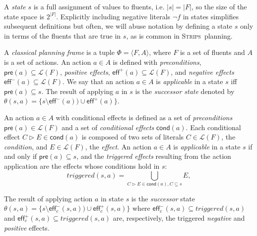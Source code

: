 \documentclass[3p,times]{elsarticle}
\newcommand{\pre}{\mathsf{pre}}  %
\newcommand{\eff}{\mathsf{eff}}  %
\newcommand{\cond}{\mathsf{cond}}   %
\newcommand{\strips}{\textsc{Strips}}     %
\newcommand{\tup}[1]{{\langle #1 \rangle}}
\begin{document}
A {\em state} $s$ is a full assignment of values to fluents, i.e. $|s|=|F|$, so the size of the state space is $2^{|F|}$. Explicitly including negative literals $\neg f$ in states simplifies subsequent definitions but often, we will abuse notation by defining a state $s$ only in terms of the fluents that are true in $s$, as is common in \strips\ planning.

A {\em classical planning frame} is a tuple $\Phi=\tup{F,A}$, where $F$ is a set of fluents and $A$ is a set of actions. An action $a\in A$ is defined with {\em preconditions}, $\pre(a)\subseteq\mathcal{L}(F)$, {\em positive effects}, $\eff^+(a)\subseteq\mathcal{L}(F)$, and {\em negative effects} $\eff^-(a)\subseteq\mathcal{L}(F)$. We say that an action $a\in A$ is {\em applicable} in a state $s$ iff $\pre(a)\subseteq s$. The result of applying $a$ in $s$ is the {\em successor state} denoted by $\theta(s,a)=\{s\setminus\eff^-(a))\cup\eff^+(a)\}$.



An action $a\in A$ with conditional effects is defined as a set of {\em preconditions} $\pre(a)\in\mathcal{L}(F)$ and a set of {\em conditional effects} $\cond(a)$. Each conditional effect $C\rhd E\in\cond(a)$ is composed of two sets of literals $C\in\mathcal{L}(F)$, the {\em condition}, and $E\in\mathcal{L}(F)$, the {\em effect}. An action $a\in A$ is {\em applicable} in a state $s$ if and only if $\pre(a)\subseteq s$, and the {\em triggered effects} resulting from the action application are the effects whose conditions hold in $s$:
\[
triggered(s,a)=\bigcup_{C\rhd E\in\cond(a),C\subseteq s} E,
\]

The result of applying action $a$ in state $s$ is the {\em successor} state $\theta(s,a)=\{s\setminus\eff_c^-(s,a))\cup\eff_c^+(s,a)\}$ where $\eff_c^-(s,a)\subseteq triggered(s,a)$ and $\eff_c^+(s,a)\subseteq triggered(s,a)$ are, respectively, the triggered {\em negative} and {\em positive} effects.
\end{document}
